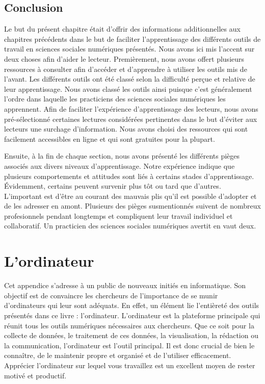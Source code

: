 \documentclass[
  letterpaper,
  DIV=11,
  numbers=noendperiod]{scrreprt}
\begin{document}
\hypertarget{conclusion-3}{%
\section{Conclusion}\label{conclusion-3}}

Le but du présent chapitre était d'offrir des informations
additionnelles aux chapitres précédents dans le but de faciliter
l'apprentissage des différents outils de travail en sciences sociales
numériques présentés. Nous avons ici mis l'accent sur deux choses afin
d'aider le lecteur. Premièrement, nous avons offert plusieurs ressources
à consulter afin d'accéder et d'apprendre à utiliser les outils mis de
l'avant. Les différents outils ont été classé selon la difficulté perçue
et relative de leur apprentissage. Nous avons classé les outils ainsi
puisque c'est généralement l'ordre dans laquelle les practiciens des
sciences sociales numériques les apprennent. Afin de faciliter
l'expérience d'apprentissage des lecteurs, nous avons pré-sélectionné
certaines lectures considérées pertinentes dans le but d'éviter aux
lecteurs une surchage d'information. Nous avons choisi des ressources
qui sont facilement accessibles en ligne et qui sont gratuites pour la
plupart.

Ensuite, à la fin de chaque section, nous avons présenté les différents
pièges associés aux divers niveaux d'apprentissage. Notre expérience
indique que plusieurs comportements et attitudes sont liés à certains
stades d'apprentissage. Évidemment, certains peuvent survenir plus tôt
ou tard que d'autres. L'important est d'être au courant des mauvais plis
qu'il est possible d'adopter et de les adresser en amont. Plusieurs des
pièges susmentionnés suivent de nombreux profesionnels pendant longtemps
et compliquent leur travail individuel et collaboratif. Un practicien
des sciences sociales numériques avertit en vaut deux.


\hypertarget{lordinateur}{%
\chapter{L'ordinateur}\label{lordinateur}}

Cet appendice s'adresse à un public de nouveaux initiés en informatique.
Son objectif est de convaincre les chercheurs de l'importance de se
munir d'ordinateurs qui leur sont adéquats. En effet, un élément lie
l'entièreté des outils présentés dans ce livre : l'ordinateur.
L'ordinateur est la plateforme principale qui réunit tous les outils
numériques nécessaires aux chercheurs. Que ce soit pour la collecte de
données, le traitement de ces données, la visualisation, la rédaction ou
la communication, l'ordinateur est l'outil principal. Il est donc
crucial de bien le connaître, de le maintenir propre et organisé et de
l'utiliser efficacement. Apprécier l'ordinateur sur lequel vous
travaillez est un excellent moyen de rester motivé et productif.
\end{document}
